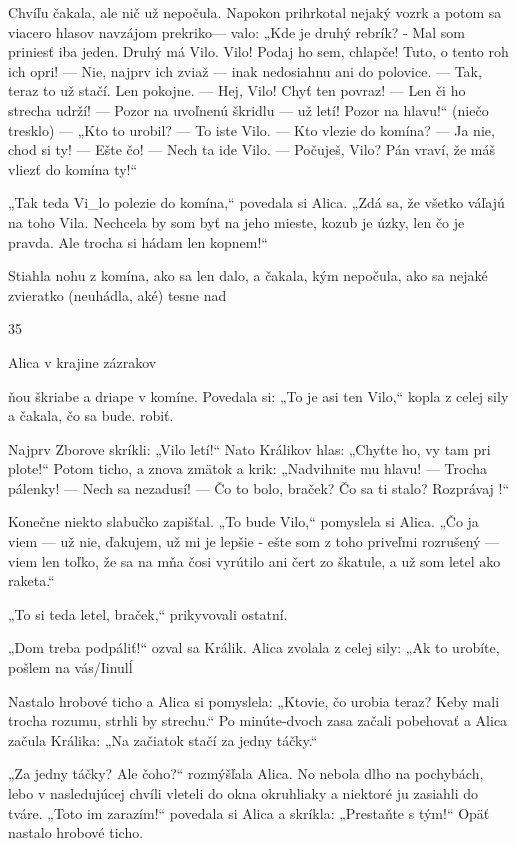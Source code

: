 \documentclass[12pt]{article}
\begin{document}
\begin{Parallel}[p]{}{}
{{Chvíľu čakala, ale nič už nepočula. Napokon prihrkotal
nejaký vozrk a potom sa viacero hlasov navzájom prekriko—
valo: „Kde je druhý rebrík? - Mal som priniesť iba jeden.
Druhý má Vilo. Vilo! Podaj ho sem, chlapče! Tuto, o tento
roh ich opri! — Nie, najprv ich zviaž — inak nedosiahnu ani
do polovice. — Tak, teraz to už stačí. Len pokojne. — Hej,
Vilo! Chyť ten povraz! — Len či ho strecha udrží! — Pozor
na uvoľnenú škridlu — už letí! Pozor na hlavu!“ (niečo
tresklo) — „Kto to urobil? — To iste Vilo. — Kto vlezie do
komína? — Ja nie, chod si ty! — Ešte čo! — Nech ta ide
Vilo. — Počuješ, Vilo? Pán vraví, že máš vliezť do komína
ty!“

„Tak teda Vi_lo polezie do komína,“ povedala si Alica.
„Zdá sa, že všetko váľajú na toho Vila. Nechcela by som
byť na jeho mieste, kozub je úzky, len čo je pravda. Ale
trocha si hádam len kopnem!“

Stiahla nohu z komína, ako sa len dalo, a čakala, kým
nepočula, ako sa nejaké zvieratko (neuhádla, aké) tesne nad

35

 

Alica v krajine zázrakov

ňou škriabe a driape v komíne. Povedala si: „To je asi ten
Vilo,“ kopla z celej sily a čakala, čo sa bude. robiť.

Najprv Zborove skríkli: „Vilo letí!“ Nato Králikov hlas:
„Chyťte ho, vy tam pri plote!“ Potom ticho, a znova zmätok
a krik: „Nadvihnite mu hlavu! — Trocha pálenky! — Nech
sa nezadusí! — Čo to bolo, braček? Čo sa ti stalo?
Rozprávaj !“

Konečne niekto slabučko zapišťal. „To bude Vilo,“
pomyslela si Alica. „Čo ja viem — už nie, ďakujem, už mi je
lepšie - ešte som z toho priveľmi rozrušený — viem len
toľko, že sa na mňa čosi vyrútilo ani čert zo škatule, a už
som letel ako raketa.“

„To si teda letel, braček,“ prikyvovali ostatní.

„Dom treba podpáliť!“ ozval sa Králik. Alica zvolala
z celej sily: „Ak to urobíte, pošlem na vás/Iinulĺ

Nastalo hrobové ticho a Alica si pomyslela: „Ktovie, čo
urobia teraz? Keby mali trocha rozumu, strhli by strechu.“
Po minúte-dvoch zasa začali pobehovať a Alica začula
Králika: „Na začiatok stačí za jedny táčky.“

„Za jedny táčky? Ale čoho?“ rozmýšľala Alica. No
nebola dlho na pochybách, lebo v nasledujúcej chvíli vleteli
do okna okruhliaky a niektoré ju zasiahli do tváre. „Toto im
zarazím!“ povedala si Alica a skríkla: „Prestaňte s tým!“
Opäť nastalo hrobové ticho.

}}
\end{Parallel}
\end{document}
